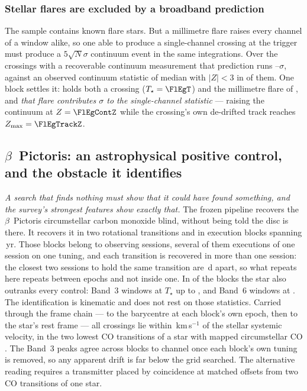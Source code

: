 \subsubsection{Stellar flares are excluded by a broadband prediction}

The sample contains known flare stars. But a millimetre flare raises every
channel of a window alike, so one able to produce a single-channel crossing at
the trigger must produce a $5\sqrt{N}\sigma$ continuum event in the same
integrations. Over the \FlNCont{} crossings with a recoverable continuum
measurement that prediction runs \FlPredLo--\FlPredHi$\sigma$, against an
observed continuum statistic of median \FlObsMed{} with $|Z|<3$ in \FlNQuiet{}
of them. One block settles it: \FlEgStar{} \texttt{\FlEgEb} holds both a
crossing ($T_\star=\FlEgT$) and the millimetre flare of
\citet{MacGregor2020}, and \emph{that flare contributes \FlEgContrib$\sigma$
to the single-channel statistic} --- raising the continuum at $Z=\FlEgContZ$
while the crossing's own de-drifted track reaches $Z_{\max}=\FlEgTrackZ$.

\subsection{$\beta$~Pictoris: an astrophysical positive control, and the
obstacle it identifies} \label{sec:bpicval}

\emph{A search that finds nothing must show that it could have found
something, and the survey's strongest features show exactly that.} The
frozen pipeline recovers the $\beta$~Pictoris circumstellar carbon monoxide
blind, without being told the disc is there. It recovers it in two
rotational transitions and in \CsBpCoBlocks{} execution
blocks spanning \BpBaselineYr\,yr. Those blocks belong to \CsBpCoSess{}
observing sessions, several of them executions of one session on one
tuning, and each transition is recovered in more than one session: the
closest two sessions to hold the same transition are \CsBpCoSepMinD\,d
apart, so what repeats here repeats between epochs and not inside one.
In \NStageOneBpicEb{} of the blocks the
star also outranks every control: \BpicNFlagThree{} Band~3 windows at
$T_\star$ up to \BpicBThreeTsym, and \BpicNFlagSix{} Band~6 windows at
\BpicBSixTsym. The identification is kinematic and does not rest on those
statistics. Carried through the frame chain --- to the barycentre at each
block's own epoch, then to the star's rest frame --- all \BpicPanelNCo{}
crossings lie within \BpicDvCoHi\,km\,s$^{-1}$ of the stellar systemic
velocity, in the two lowest CO transitions of a star with mapped
circumstellar CO \citep{Dent2014,Matra2017}. The Band~3 peaks agree across blocks to
\BpRecThreeTuneChanMax{} channel once each block's own tuning is removed, so
any apparent drift is far below the grid searched. The alternative reading
requires a transmitter placed by coincidence at matched offsets from two CO
transitions of one star.

